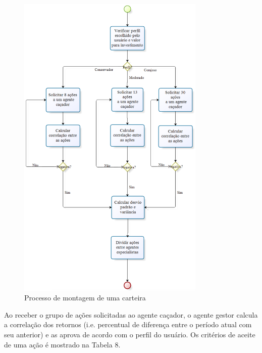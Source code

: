 \begin{description}
\begin{itemize}
\begin{figure}[H]
\centering
\label{f23}
\includegraphics[width=0.8\textwidth]{figuras/f14}
\caption{Processo de montagem de uma carteira}

\end{figure}
\FloatBarrier

Ao receber o grupo de ações solicitadas ao agente caçador, o agente gestor calcula a correlação dos retornos (i.e. percentual de diferença entre o período atual com seu anterior) e as aprova de acordo com o perfil do usuário. Os critérios de aceite de uma ação é mostrado na Tabela 8.



\end{itemize}
\end{description}
